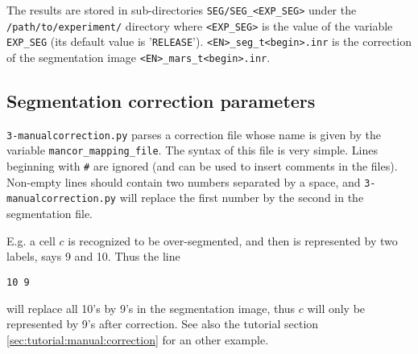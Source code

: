 The results are stored in sub-directories
\texttt{SEG/SEG\_<EXP\_SEG>} under the
\texttt{/path/to/experiment/} directory where \texttt{<EXP\_SEG>} is the value of the variable \texttt{EXP\_SEG} (its
default value is '\texttt{RELEASE}').
\texttt{<EN>\_seg\_t<begin>.inr} is the correction of the segmentation image \texttt{<EN>\_mars\_t<begin>.inr}.


\subsection{Segmentation correction parameters}

\texttt{3-manualcorrection.py} parses a correction file whose name is given by the variable \texttt{mancor\_mapping\_file}. The syntax of this file is very simple. Lines beginning with \texttt{\#} are ignored (and can be used to insert comments in the files). Non-empty lines should contain two numbers separated by a space, and \texttt{3-manualcorrection.py} will replace the first number by the second in the segmentation file.

E.g. a cell $c$ is recognized to be over-segmented, and then is represented by two labels, says 9 and 10. Thus the line
\begin{framed}
\begin{verbatim}
10 9
\end{verbatim}
\end{framed}
will replace all 10's by 9's in the segmentation image,  thus $c$ will only be represented by 9's after correction. See also the tutorial section \ref{sec:tutorial:manual:correction} for an other example.


